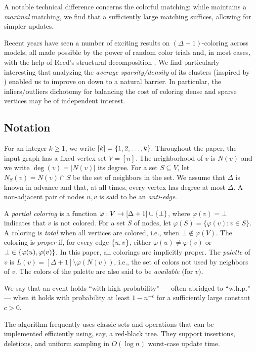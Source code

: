 \documentclass[a4paper,english,11pt]{amsart}
\theoremstyle{definition}
\renewcommand{\geq}{\geqslant}
\DeclarePairedDelimiter{\set}{\{}{\}}
\newcommand{\whp}{$\text{w.h.p.}$\xspace}
\newcommand{\col}{\varphi}
\newcommand{\NS}{N_{S}}
\begin{document}
A notable technical difference concerns the colorful matching: while \cite{BRW24} maintains a \emph{maximal} matching, we find that a sufficiently large matching suffices, allowing for simpler updates.

Recent years have seen a number of exciting results on $(\Delta+1)$-coloring across models, all made possible by the power of random color trials and, in most cases, with the help of Reed's structural decomposition \cite{Reed98}. We find particularly interesting that analyzing the \emph{average sparsity/density} of its clusters (inspired by \cite{HNT21,FGHKN23}) enabled us to improve on \cite{BRW24} down to a natural barrier. 
In particular, the inliers/outliers dichotomy for balancing the cost of coloring dense and sparse vertices may be of independent interest. 
\subsection{Notation}
For an integer $k \geq 1$, we write $[k] = \set{1, 2, \ldots, k}$. Throughout the paper, the input graph has a fixed vertex set $V = [n]$. The neighborhood of $v$ is $N(v)$ and we write $\deg(v) = |N(v)|$ its degree. For a set $S \subseteq V$, let $\NS(v) = N(v) \cap S$ be the set of neighbors in the set.
We assume that $\Delta$ is known in advance and that, at all times, every vertex has degree at most $\Delta$.
A non-adjacent pair of nodes $u,v$ is said to be an \emph{anti-edge}.

A \emph{partial coloring} is a function $\col : V \to [\Delta + 1] \cup \set{ \bot }$, where $\col(v) = \bot$ indicates that $v$ is not colored. For a set $S$ of nodes, let $\col(S) = \{\col(v) : v \in S\}$.
A coloring is \emph{total} when all vertices are colored, i.e., when $\bot \notin \col(V)$. The coloring is \emph{proper} if, for every edge $\set{u,v}$, either $\col(u) \neq \col(v)$ or $\bot \in \set{\col(u), \col(v)}$. In this paper, all colorings are implicitly proper. The \emph{palette} of $v$ is $L(v) = [\Delta + 1] \setminus \col(N(v))$, i.e., the set of colors not used by neighbors of $v$. The colors of the palette are also said to be \emph{available} (for $v$).

We say that an event holds ``with high probability'' --- often abridged to ``\whp'' --- when it holds with probability at least $1 - n^{-c}$ for a sufficiently large constant $c > 0$.

The algorithm frequently uses classic sets and operations that can be implemented efficiently using, say, a red-black tree.
They support insertions, deletions, and uniform sampling in $O(\log n)$ worst-case update time.
\end{document}
